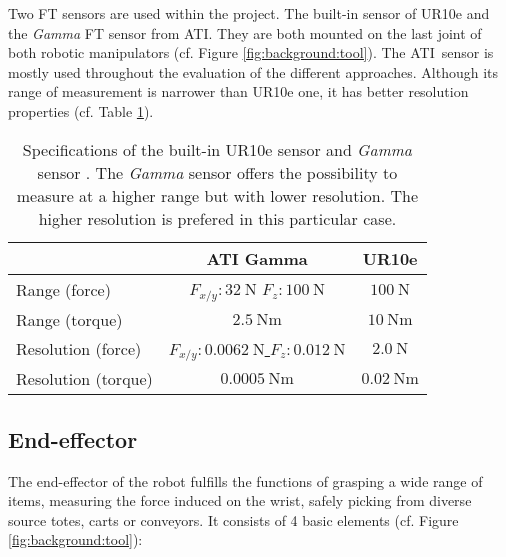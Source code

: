 \documentclass[/home/francois/latex/report/main.tex]{subfiles}
\begin{document}
Two \ac{FT} sensors are used within the project. The built-in sensor of UR10e and the \textit{Gamma} \ac{FT} sensor from ATI\texttrademark. They are both mounted on the last joint of both robotic manipulators (cf. Figure \ref{fig:background:tool}). The ATI\texttrademark \ sensor is mostly used throughout the evaluation of the different approaches. Although its range of measurement is narrower than UR10e one, it has better resolution properties (cf. Table \ref{tab:background:ft-sensor}).

\begin{table}[h]
  \begin{center}
    \renewcommand{\arraystretch}{1.8} %
    \begin{tabular}{l|c|c} %
      & \textbf{ATI Gamma} & \textbf{UR10e}\\
      \hline
      Range (force)  & $F_{x/y}: 32 \ \si{\newton}$ $F_z: 100 \ \si{\newton}$ & \underline{$100 \ \si{\newton}$} \\
      \hline
      Range (torque)  & $2.5 \ \si{\newton} \si{\meter}$ & \underline{$10 \ \si{\newton} \si{\meter}$} \\
      \hline
      Resolution (force)  & \underline{$F_{x/y}: 0.0062 \ \si{\newton}$ $F_z: 0.012 \ \si{\newton}$} & $2.0 \ \si{\newton}$ \\
      \hline
      Resolution (torque)  & \underline{$0.0005 \ \si{\newton} \si{\meter}$} & $0.02 \ \si{\newton} \si{\meter}$ \\
      \hline
    \end{tabular}
  \end{center}
  \caption{Specifications of the built-in UR10e sensor and \textit{Gamma} sensor \cite{ati, ur10e}. The \textit{Gamma} sensor offers the possibility to measure at a higher range but with lower resolution. The higher resolution is prefered in this particular case.\label{tab:background:ft-sensor}}
\end{table}

\subsection{End-effector}

The end-effector of the robot fulfills the functions of grasping a wide range of items, measuring the force induced on the wrist, safely picking from diverse source totes, carts or conveyors. It consists of 4 basic elements (cf. Figure \ref{fig:background:tool}):
\end{document}
